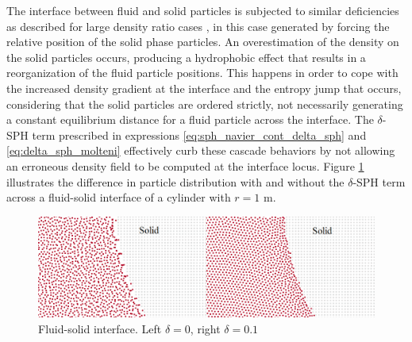 The interface between fluid and solid particles is subjected to similar deficiencies as described for large density ratio cases \cite{Colagrossi-2003}, in this case generated by forcing the relative position of the solid phase particles. An overestimation of the density on the solid particles occurs, producing a hydrophobic effect that results in a reorganization of the fluid particle positions. This happens in order to cope with the increased density gradient at the interface and the entropy jump that occurs, considering that the solid particles are ordered strictly, not necessarily generating a constant equilibrium distance for a fluid particle across the interface. The $\delta$-SPH term prescribed in expressions \eqref{eq:sph_navier_cont_delta_sph} and \eqref{eq:delta_sph_molteni} effectively curb these cascade behaviors by not allowing an erroneous density field to be computed at the interface locus. Figure \ref{fig:delta_posits} illustrates the difference in particle distribution with and without the $\delta$-SPH term across a fluid-solid interface of a cylinder with $r=1$ m.
%
\begin{figure}[ht!]
	\centering
	\includegraphics[width=0.8\linewidth]{Figures/5.Chapter/fig1b_text}
	\caption{Fluid-solid interface. Left $\delta=0$, right $\delta=0.1$ }
	\label{fig:delta_posits} 
\end{figure}
%

